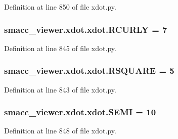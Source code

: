 Definition at line 850 of file xdot.\+py.

\subsubsection[{\texorpdfstring{R\+C\+U\+R\+LY}{RCURLY}}]{ smacc\+\_\+viewer.\+xdot.\+xdot.\+R\+C\+U\+R\+LY = 7}\hypertarget{namespacesmacc__viewer_1_1xdot_1_1xdot_ae7f67ed6b5533a9668a1eb4e53089aa0}{}\label{namespacesmacc__viewer_1_1xdot_1_1xdot_ae7f67ed6b5533a9668a1eb4e53089aa0}


Definition at line 845 of file xdot.\+py.

\subsubsection[{\texorpdfstring{R\+S\+Q\+U\+A\+RE}{RSQUARE}}]{ smacc\+\_\+viewer.\+xdot.\+xdot.\+R\+S\+Q\+U\+A\+RE = 5}\hypertarget{namespacesmacc__viewer_1_1xdot_1_1xdot_ac588a5ea8d5c206328915ff5c2878e4c}{}\label{namespacesmacc__viewer_1_1xdot_1_1xdot_ac588a5ea8d5c206328915ff5c2878e4c}


Definition at line 843 of file xdot.\+py.

\subsubsection[{\texorpdfstring{S\+E\+MI}{SEMI}}]{ smacc\+\_\+viewer.\+xdot.\+xdot.\+S\+E\+MI = 10}\hypertarget{namespacesmacc__viewer_1_1xdot_1_1xdot_a47b532ee9a2567266684541cbe08bc47}{}\label{namespacesmacc__viewer_1_1xdot_1_1xdot_a47b532ee9a2567266684541cbe08bc47}


Definition at line 848 of file xdot.\+py.

